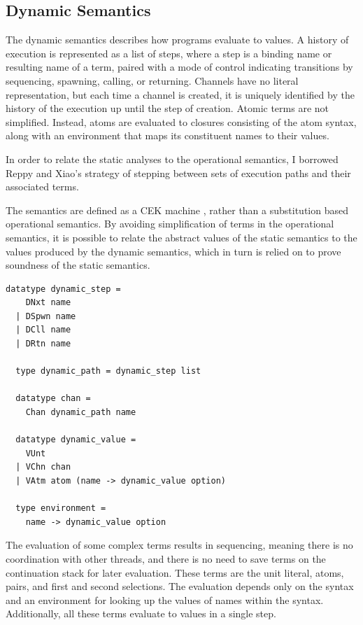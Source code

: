 \documentclass[10pt]{article}
\begin{document}
\subsection{Dynamic Semantics}
The dynamic semantics describes how programs evaluate to values.
A history of execution is represented as a list of steps, where a step is a
binding name or resulting name of a term, paired with a mode of control indicating
transitions by sequencing, spawning, calling, or returning.
Channels have no literal representation, but each
time a channel is created, it is uniquely identified by the history of the execution up until
the step of creation. Atomic terms are not simplified. Instead, atoms are evaluated to
closures consisting of the atom syntax, along with an environment that maps its
constituent names to their values.

In order to relate the static analyses to the operational semantics, I
borrowed Reppy and Xiao's strategy of stepping between sets of execution paths and
their associated terms.

The semantics are defined as a CEK machine \cite{}, rather than a
substitution based operational semantics. By avoiding simplification of terms in the
operational semantics, it is possible to relate
the abstract values of the static semantics to the
values produced by the dynamic semantics,
which in turn is relied on to prove soundness of the static semantics.


\begin{lstlisting}[language=logic]
  datatype dynamic_step =
    DNxt name
  | DSpwn name
  | DCll name
  | DRtn name 

  type dynamic_path = dynamic_step list

  datatype chan =
    Chan dynamic_path name 

  datatype dynamic_value = 
    VUnt
  | VChn chan
  | VAtm atom (name -> dynamic_value option)

  type environment =
    name -> dynamic_value option
\end{lstlisting}

The evaluation of some complex terms results in sequencing, meaning there is no coordination
with other threads, and there is no need to save terms on
the continuation stack for later evaluation. These terms are the
unit literal, atoms, pairs, and first and second selections. The evaluation depends only
on the syntax and an environment for looking up the values of names within the syntax.
Additionally, all these terms evaluate to values in a single step.
\end{document}
